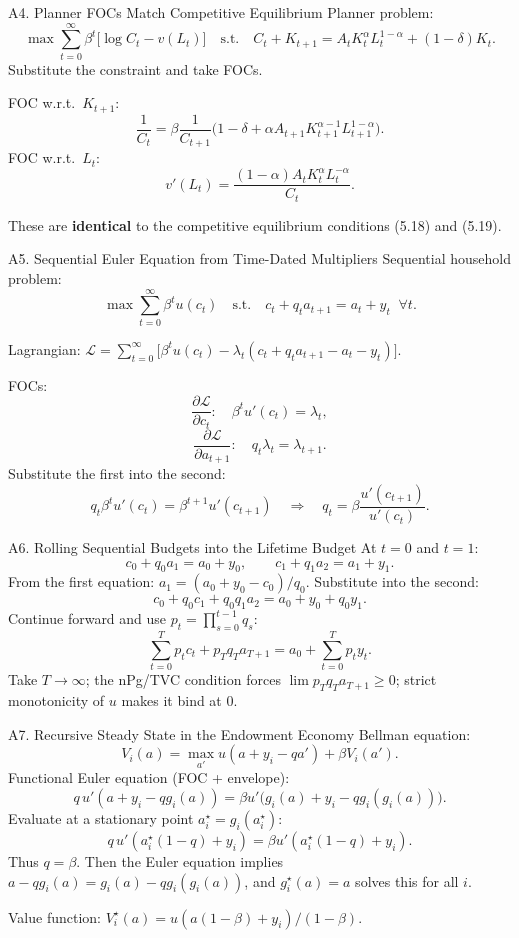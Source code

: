 \documentclass[aspectratio=169,10pt]{beamer}
\newcommand{\backbutton}[1]{\hfill\hyperlink{#1}{\beamerbutton{Back}}}
\begin{document}
\begin{frame}{A4. Planner FOCs Match Competitive Equilibrium}
\hypertarget{a4}{}
Planner problem:
\[
\max \sum_{t=0}^{\infty}\beta^t\big[\log C_t-v(L_t)\big]
\quad\text{s.t.}\quad
C_t+K_{t+1}=A_tK_t^\alpha L_t^{1-\alpha}+(1-\delta)K_t.
\]
Substitute the constraint and take FOCs.

\medskip
FOC w.r.t.\ $K_{t+1}$:
\[
\frac{1}{C_t}
=
\beta \frac{1}{C_{t+1}}
\Big(1-\delta+\alpha A_{t+1}K_{t+1}^{\alpha-1}L_{t+1}^{1-\alpha}\Big).
\]
FOC w.r.t.\ $L_t$:
\[
v'(L_t)=\frac{(1-\alpha)A_tK_t^\alpha L_t^{-\alpha}}{C_t}.
\]

These are \textbf{identical} to the competitive equilibrium conditions (5.18) and (5.19).
\backbutton{m-a4}
\end{frame}

\begin{frame}{A5. Sequential Euler Equation from Time-Dated Multipliers}
\hypertarget{a5}{}
Sequential household problem:
\[
\max \sum_{t=0}^{\infty}\beta^t u(c_t)
\quad\text{s.t.}\quad c_t+q_t a_{t+1}=a_t+y_t \;\;\forall t.
\]

Lagrangian: $\mathcal{L}=\sum_{t=0}^{\infty}\big[\beta^t u(c_t)-\lambda_t(c_t+q_t a_{t+1}-a_t-y_t)\big]$.

\medskip
FOCs:
\[
\frac{\partial\mathcal{L}}{\partial c_t}: \quad \beta^t u'(c_t)=\lambda_t,
\]
\[
\frac{\partial\mathcal{L}}{\partial a_{t+1}}: \quad q_t\lambda_t=\lambda_{t+1}.
\]
Substitute the first into the second:
\[
q_t \beta^t u'(c_t)=\beta^{t+1}u'(c_{t+1})
\quad\Rightarrow\quad
q_t=\beta\frac{u'(c_{t+1})}{u'(c_t)}.
\]
\backbutton{m-a5}
\end{frame}

\begin{frame}{A6. Rolling Sequential Budgets into the Lifetime Budget}
\hypertarget{a6}{}
At $t=0$ and $t=1$:
\[
c_0+q_0 a_1=a_0+y_0,
\qquad
c_1+q_1 a_2=a_1+y_1.
\]
From the first equation: $a_1=(a_0+y_0-c_0)/q_0$. Substitute into the second:
\[
c_0 + q_0 c_1 + q_0 q_1 a_2 = a_0+y_0+q_0 y_1.
\]
Continue forward and use $p_t=\prod_{s=0}^{t-1}q_s$:
\[
\sum_{t=0}^{T}p_t c_t+p_T q_T a_{T+1}
=
a_0+\sum_{t=0}^{T}p_t y_t.
\]
Take $T\to\infty$; the nPg/TVC condition forces $\lim p_T q_T a_{T+1}\geq 0$; strict monotonicity of $u$ makes it bind at 0.
\backbutton{m-a6}
\end{frame}

\begin{frame}{A7. Recursive Steady State in the Endowment Economy}
\hypertarget{a7}{}
Bellman equation:
\[
V_i(a)=\max_{a'} u(a+y_i-qa')+\beta V_i(a').
\]
Functional Euler equation (FOC + envelope):
\[
q\,u'(a+y_i-qg_i(a))
=
\beta u'\big(g_i(a)+y_i-qg_i(g_i(a))\big).
\]
Evaluate at a stationary point $a_i^\star=g_i(a_i^\star)$:
\[
q\,u'(a_i^\star(1-q)+y_i)
=
\beta u'(a_i^\star(1-q)+y_i).
\]
Thus $q=\beta$. Then the Euler equation implies $a-qg_i(a)=g_i(a)-qg_i(g_i(a))$, and $g_i^\star(a)=a$ solves this for all $i$.

\medskip
Value function: $V_i^\star(a)=u(a(1-\beta)+y_i)/(1-\beta)$.
\backbutton{m-a7}
\end{frame}
\end{document}
